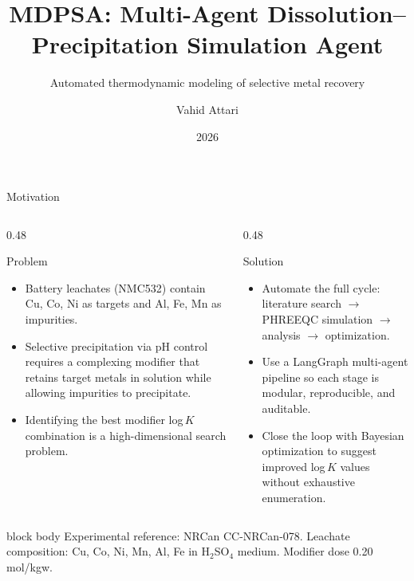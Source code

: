 \documentclass[8pt,aspectratio=169]{beamer}
\title{MDPSA: Multi-Agent Dissolution--Precipitation Simulation Agent}
\subtitle{Automated thermodynamic modeling of selective metal recovery}
\author{Vahid Attari}
\date{2026}
\institute{NRCan CC-NRCan-078}
\begin{document}
\maketitle

\begin{frame}{Motivation}
  \begin{columns}[T]
    \begin{column}{0.48\textwidth}
      \begin{block}{Problem}
        \begin{itemize}
          \setlength{\itemsep}{5pt}
          \item Battery leachates (NMC532) contain Cu, Co, Ni as targets
                and Al, Fe, Mn as impurities.
          \item Selective precipitation via pH control requires a
                complexing modifier that retains target metals in solution
                while allowing impurities to precipitate.
          \item Identifying the best modifier log$\,K$ combination is
                a high-dimensional search problem.
        \end{itemize}
      \end{block}
    \end{column}
    \begin{column}{0.48\textwidth}
      \begin{block}{Solution}
        \begin{itemize}
          \setlength{\itemsep}{5pt}
          \item Automate the full cycle: literature search $\to$
                PHREEQC simulation $\to$ analysis $\to$ optimization.
          \item Use a LangGraph multi-agent pipeline so each stage
                is modular, reproducible, and auditable.
          \item Close the loop with Bayesian optimization to suggest
                improved log$\,K$ values without exhaustive enumeration.
        \end{itemize}
      \end{block}
    \end{column}
  \end{columns}
  \vspace{4pt}
  \begin{beamercolorbox}[rounded=true, shadow=false, wd=\textwidth]{block body}
    \tiny
    Experimental reference: NRCan CC-NRCan-078. Leachate composition: Cu, Co, Ni, Mn, Al, Fe in H$_2$SO$_4$ medium. Modifier dose 0.20 mol/kgw.
  \end{beamercolorbox}
\end{frame}
\end{document}
